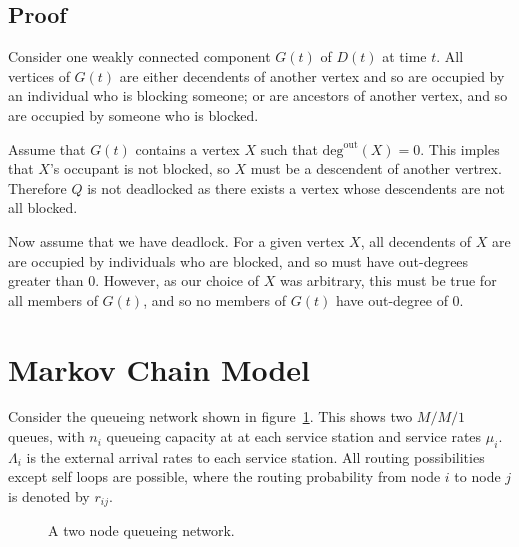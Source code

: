 \documentclass{article}
\begin{document}
\subsection*{Proof}

Consider one weakly connected component $G(t)$ of $D(t)$ at time $t$.
All vertices of $G(t)$ are either decendents of another vertex and so are occupied by an individual who is blocking someone; or are ancestors of another vertex, and so are occupied by someone who is blocked.\newline

Assume that $G(t)$ contains a vertex $X$ such that $\text{deg}^{\text{out}}(X) = 0$.
This imples that $X$'s occupant is not blocked, so $X$ must be a descendent of another vertrex.
Therefore $Q$ is not deadlocked as there exists a vertex whose descendents are not all blocked.\newline

Now assume that we have deadlock.
For a given vertex $X$, all decendents of $X$ are are occupied by individuals who are blocked, and so must have out-degrees greater than 0.
However, as our choice of $X$ was arbitrary, this must be true for all members of $G(t)$, and so no members of $G(t)$ have out-degree of 0.\newline


\section{Markov Chain Model}

Consider the queueing network shown in figure~\ref{fig:queueingnetwork_2nodes}.
This shows two \(M/M/1\) queues, with \(n_i\) queueing capacity at at each service station and service rates $\mu_i$.
$\Lambda_i$ is the external arrival rates to each service station.
All routing possibilities except self loops are possible, where the routing probability from node $i$ to node $j$ is denoted by $r_{ij}$.

\begin{figure}[H]
  
  \caption{A two node queueing network.}
  \label{fig:queueingnetwork_2nodes}
\end{figure}
\end{document}
